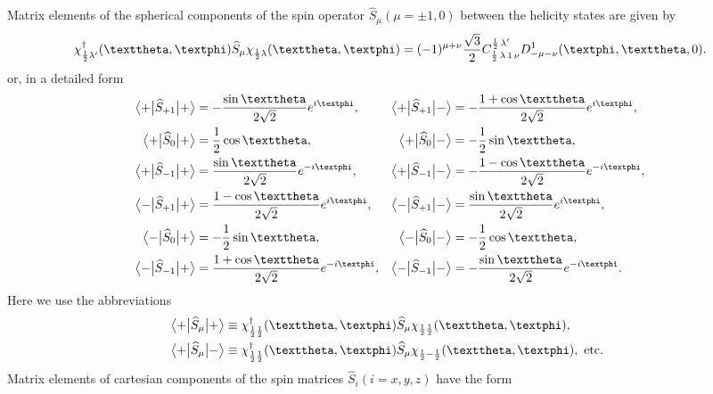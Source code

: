 Matrix elements of the spherical components of the spin operator $\widehat{S}_{\mu}(\mu= \pm 1,0)$ between the helicity states are given by
\begin{equation}
\chi_{\frac{1}{2} \lambda^{\prime}}^{\dagger}(\vartheta, \varphi) \widehat{S}_{\mu} \chi_{\frac{1}{2} \lambda}(\vartheta, \varphi)=(-1)^{\mu+\nu} \frac{\sqrt{3}}{2} \clebsch{\frac{1}{2}}{\lambda}{1}{\nu}{\frac{1}{2}}{\lambda^{\prime}} D_{-\mu-\nu}^{1}(\varphi, \vartheta, 0) . \label{eq:6:2:28}
\end{equation}
or, in a detailed form
\begin{align}
\braOket{+}{\widehat{S}_{+1}}{+} & =-\frac{\sin \vartheta}{2 \sqrt{2}} e^{i \varphi} ,& \braOket{+}{\widehat{S}_{+1}}{-} & =-\frac{1+\cos \vartheta}{2 \sqrt{2}} e^{i \varphi}  , \notag\\
\braOket{+}{\widehat{S}_{0}}{+} & =\frac{1}{2} \cos \vartheta, & \braOket{+}{\widehat{S}_{0}}{-} & =-\frac{1}{2} \sin \vartheta  , \notag\\
\braOket{+}{\widehat{S}_{-1}}{+} & =\frac{\sin \vartheta}{2 \sqrt{2}} e^{-i \varphi}, & \braOket{+}{\widehat{S}_{-1}}{-} & =-\frac{1-\cos \vartheta}{2 \sqrt{2}} e^{-i \varphi}  , \label{eq:6:2:29}\\
\braOket{-}{\widehat{S}_{+1}}{+} & =\frac{1-\cos \vartheta}{2 \sqrt{2}} e^{i \varphi}, & \braOket{-}{\widehat{S}_{+1}}{-} & =\frac{\sin \vartheta}{2 \sqrt{2}} e^{i \varphi} , \notag\\
\braOket{-}{\widehat{S}_{0}}{+} & =-\frac{1}{2} \sin \vartheta, & \braOket{-}{\widehat{S}_{0}}{-} & =-\frac{1}{2} \cos \vartheta, \notag\\
\braOket{-}{\widehat{S}_{-1}}{+} & =\frac{1+\cos \vartheta}{2 \sqrt{2}} e^{-i \varphi}, & \braOket{-}{\widehat{S}_{-1}}{-} & =-\frac{\sin \vartheta}{2 \sqrt{2}} e^{-i \varphi} . \notag
\end{align}
Here we use the abbreviations
\[
\begin{aligned}
& \braOket{+}{\widehat{S}_{\mu}}{+} \equiv \chi_{\frac{1}{2} \frac{1}{2}}^{\dagger}(\vartheta, \varphi) \widehat{S}_{\mu} \chi_{\frac{1}{2} \frac{1}{2}}(\vartheta, \varphi), \\
& \braOket{+}{\widehat{S}_{\mu}}{-} \equiv \chi_{\frac{1}{2} \frac{1}{2}}^{\dagger}(\vartheta, \varphi) \widehat{S}_{\mu} \chi_{\frac{1}{2}-\frac{1}{2}}(\vartheta, \varphi), \text { etc. }
\end{aligned}
\]
Matrix elements of cartesian components of the spin matrices $\widehat{S}_{i}(i=x, y, z)$ have the form
